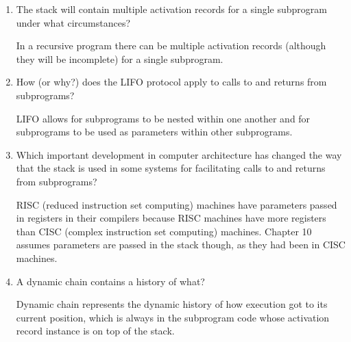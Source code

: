 \begin{enumerate}
\begin{answer}
  \end{answer}

  \item The stack will contain multiple activation
    records for a single subprogram under what
    circumstances?

  \begin{answer}

    In a recursive program there can be multiple activation
    records (although they will be incomplete) for a single
    subprogram.

  \end{answer}

  \item How (or why?) does the LIFO protocol apply to
    calls to and returns from subprograms?

  \begin{answer}

    LIFO allows for subprograms to be nested within one
    another and for subprograms to be used as parameters
    within other subprograms.

  \end{answer}

  \item Which important development in computer architecture
    has changed the way that the stack is used in some
    systems for facilitating calls to and returns from
    subprograms?

  \begin{answer}

    RISC (reduced instruction set computing) machines
    have parameters passed in registers in their
    compilers because RISC machines have more registers
    than CISC (complex instruction set computing)
    machines. Chapter 10 assumes parameters are passed
    in the stack though, as they had been in CISC
    machines.

  \end{answer}

  \item A dynamic chain contains a history of what?

  \begin{answer}

    Dynamic chain represents the dynamic history of how
    execution got to its current position, which is
    always in the subprogram code whose activation
    record instance is on top of the stack.

  \end{answer}


\end{enumerate}
